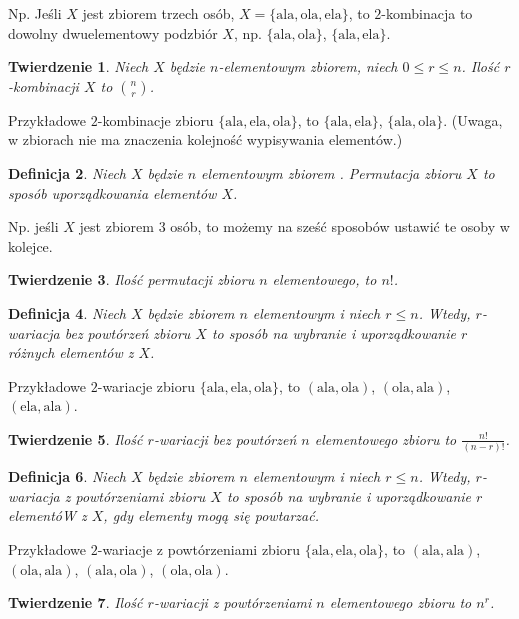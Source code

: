 \documentclass[12pt]{article}
\newtheorem{thm}{Twierdzenie}
\newtheorem{dfn}[thm]{Definicja}
\newcommand{\ala}{\textrm{ala}}
\newcommand{\ela}{\textrm{ela}}
\newcommand{\ola}{\textrm{ola}}
\begin{document}
Np. Jeśli $X$ jest zbiorem trzech osób,
$X=\{\ala, \ola, \ela \}$, to $2$-kombinacja
to dowolny dwuelementowy podzbiór $X$, 
np. $\{\ala, \ola \}$, $\{\ala, \ela\}$.

\begin{thm}
	Niech $X$ będzie $n$-elementowym zbiorem, niech $0\leq r\leq n$. Ilość $r$-kombinacji $X$ to $\binom{n}{r}$.
\end{thm}



Przykładowe $2$-kombinacje zbioru $\{\ala, \ela, \ola\}$,
to $\{\ala, \ela\}$, $\{\ala, \ola\}$.
(Uwaga, w zbiorach nie ma znaczenia kolejność wypisywania
elementów.)


\begin{dfn}
Niech $X$ będzie $n$ elementowym zbiorem .
Permutacja zbioru $X$ to sposób uporządkowania 
elementów $X$.
\end{dfn} 

Np. jeśli $X$ jest zbiorem $3$ osób, to możemy
na sześć sposobów ustawić te osoby w kolejce.



\begin{thm}
	Ilość permutacji zbioru $n$ elementowego,
	to $n!$.
\end{thm}


\begin{dfn}
	Niech $X$ będzie zbiorem $n$ elementowym i niech $r\leq n$.
	Wtedy, $r$-wariacja bez powtórzeń zbioru $X$ to sposób na wybranie i uporządkowanie $r$ różnych elementów z $X$.
\end{dfn} 

Przykładowe $2$-wariacje zbioru $\{\ala, \ela, \ola\}$,
to $(\ala, \ola)$, $(\ola, \ala)$, $(\ela, \ala)$.

\begin{thm}
	Ilość $r$-wariacji bez powtórzeń $n$ elementowego zbioru 
	to $\frac{n!}{(n-r)!}$.
\end{thm}

\begin{dfn}
	Niech $X$ będzie zbiorem $n$ elementowym i niech $r\leq n$.
	Wtedy, $r$-wariacja z powtórzeniami zbioru $X$ to sposób na wybranie i uporządkowanie $r$ elementóW z $X$, gdy elementy mogą się powtarzać.
\end{dfn} 

Przykładowe $2$-wariacje z powtórzeniami 
zbioru $\{\ala, \ela, \ola\}$,
to $(\ala, \ala)$, $(\ola, \ala)$, 
$(\ala, \ola)$, $(\ola, \ola)$.


\begin{thm}
	Ilość $r$-wariacji z powtórzeniami $n$ elementowego zbioru 
	to $n^r$.
\end{thm}
\end{document}
